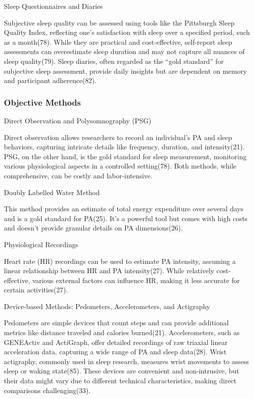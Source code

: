 \documentclass[
  9pt,
]{article}
\begin{document}
Sleep Questionnaires and Diaries

Subjective sleep quality can be assessed using tools like the Pittsburgh
Sleep Quality Index, reflecting one's satisfaction with sleep over a
specified period, such as a month(78). While they are practical and
cost-effective, self-report sleep assessments can overestimate sleep
duration and may not capture all nuances of sleep quality(79). Sleep
diaries, often regarded as the ``gold standard'' for subjective sleep
assessment, provide daily insights but are dependent on memory and
participant adherence(82).

\hypertarget{objective-methods}{%
\subsubsection{Objective Methods}\label{objective-methods}}

Direct Observation and Polysomnography (PSG)

Direct observation allows researchers to record an individual's PA and
sleep behaviors, capturing intricate details like frequency, duration,
and intensity(21). PSG, on the other hand, is the gold standard for
sleep measurement, monitoring various physiological aspects in a
controlled setting(78). Both methods, while comprehensive, can be costly
and labor-intensive.

Doubly Labelled Water Method

This method provides an estimate of total energy expenditure over
several days and is a gold standard for PA(25). It's a powerful tool but
comes with high costs and doesn't provide granular details on PA
dimensions(26).

Physiological Recordings

Heart rate (HR) recordings can be used to estimate PA intensity,
assuming a linear relationship between HR and PA intensity(27). While
relatively cost-effective, various external factors can influence HR,
making it less accurate for certain activities(27).

Device-based Methods: Pedometers, Accelerometers, and Actigraphy

Pedometers are simple devices that count steps and can provide
additional metrics like distance traveled and calories burned(21).
Accelerometers, such as GENEActiv and ActiGraph, offer detailed
recordings of raw triaxial linear acceleration data, capturing a wide
range of PA and sleep data(28). Wrist actigraphy, commonly used in sleep
research, measures wrist movements to assess sleep or waking state(85).
These devices are convenient and non-intrusive, but their data might
vary due to different technical characteristics, making direct
comparisons challenging(33).
\end{document}
